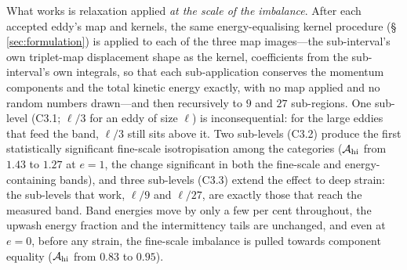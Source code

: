\documentclass[lineno]{JFM-FLM_Au}
\begin{document}
What works is relaxation applied \emph{at the scale of the imbalance}.
After each accepted eddy's map and kernels, the same energy-equalising
kernel procedure (\S\,\ref{sec:formulation}) is applied to each of the
three map images---the sub-interval's own triplet-map displacement shape
as the kernel, coefficients from the sub-interval's own integrals, so
that each sub-application conserves the momentum components and the total
kinetic energy exactly, with no map applied and no random numbers
drawn---and then recursively to $9$ and $27$ sub-regions. 
One sub-level (C3.1; $\ell/3$ for an eddy of size $\ell$) is inconsequential: for the large eddies that
feed the band, $\ell/3$ still sits above it. Two sub-levels (C3.2) produce the first statistically significant fine-scale isotropisation among the categories ($\mathcal A_{\rm hi}$ from $1.43$ to $1.27$ at $e=1$, the change significant in both the fine-scale and energy-containing bands), and three sub-levels (C3.3) extend the effect to deep strain: the sub-levels that work, $\ell/9$ and $\ell/27$, are exactly those that reach the measured band. Band energies move by only a few per cent throughout, the upwash energy fraction and the intermittency tails are unchanged, and even at $e=0$, before any strain, the fine-scale imbalance is pulled towards component equality ($\mathcal A_{\rm hi}$ from $0.83$ to $0.95$).
\end{document}
